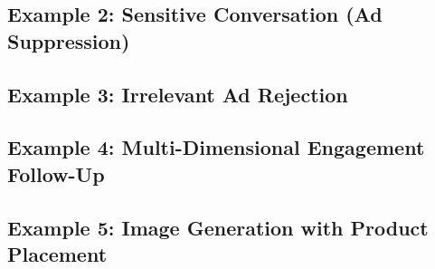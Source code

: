 \documentclass[11pt, a4paper]{article}
\numberwithin{equation}{section}
\theoremstyle{plain}
\theoremstyle{definition}
\theoremstyle{remark}
\begin{document}
\subsection{Example 2: Sensitive Conversation (Ad Suppression)}
\label{subsec:example-sensitive}

 
\subsection{Example 3: Irrelevant Ad Rejection}
\label{subsec:example-irrelevant}

 
\subsection{Example 4: Multi-Dimensional Engagement Follow-Up}            %
\label{subsec:example-engagement}

 
\subsection{Example 5: Image Generation with Product Placement}
\label{subsec:example-image-generation}

 

 
   


\newpage
\printbibliography[heading=bibintoc, title={References}]


\newpage



\printglossaries
\end{document}
